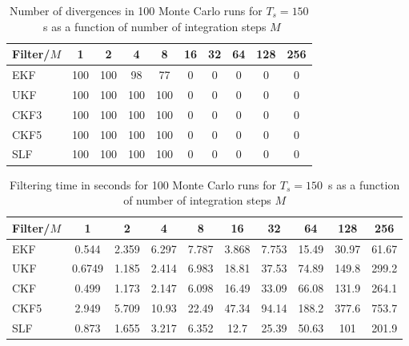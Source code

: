 \documentclass[../zhang_thesis.tex]{subfiles}
\begin{document}
\begin{table}[h]
\centering
\caption{Number of divergences in 100 Monte Carlo runs for $T_s=150$~s as a function of number of integration steps $M$}
\begin{tabular}{@{}l*{9}{c}@{}}
\toprule
Filter/$M$ & 1   & 2   & 4   & 8   & 16 & 32 & 64 & 128 & 256 \\
\midrule
EKF        & 100 & 100 & 98  & 77  & 0  & 0  & 0  & 0   & 0   \\
UKF        & 100 & 100 & 100 & 100 & 0  & 0  & 0  & 0   & 0   \\
CKF3       & 100 & 100 & 100 & 100 & 0  & 0  & 0  & 0   & 0   \\
CKF5       & 100 & 100 & 100 & 100 & 0  & 0  & 0  & 0   & 0   \\
SLF        & 100 & 100 & 100 & 100 & 0  & 0  & 0  & 0   & 0   \\
\bottomrule
\end{tabular}
\label{tab:div_150}
\end{table}

\begin{table}[h]
\centering
\caption{Filtering time in seconds for 100 Monte Carlo runs for $T_s=150$~s as a function of number of integration steps $M$}
\begin{tabular}{@{}lccccccccc@{}}
\toprule
Filter/$M$ & 1      & 2     & 4     & 8     & 16    & 32    & 64    & 128   & 256   \\ \midrule
EKF        & 0.544  & 2.359 & 6.297 & 7.787 & 3.868 & 7.753 & 15.49 & 30.97 & 61.67 \\
UKF        & 0.6749 & 1.185 & 2.414 & 6.983 & 18.81 & 37.53 & 74.89 & 149.8 & 299.2 \\
CKF        & 0.499  & 1.173 & 2.147 & 6.098 & 16.49 & 33.09 & 66.08 & 131.9 & 264.1 \\
CKF5       & 2.949  & 5.709 & 10.93 & 22.49 & 47.34 & 94.14 & 188.2 & 377.6 & 753.7 \\
SLF        & 0.873  & 1.655 & 3.217 & 6.352 & 12.7  & 25.39 & 50.63 & 101   & 201.9 \\ \bottomrule
\end{tabular}
\label{tab:time_150}
\end{table}
\end{document}
